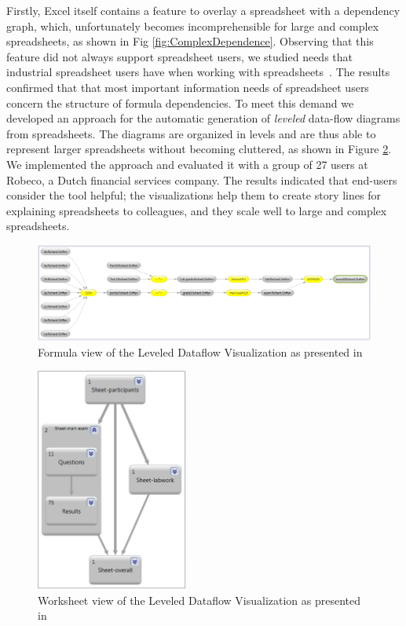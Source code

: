 \documentclass[conference]{IEEEtran}
\begin{document}
Firstly, Excel itself contains a feature to overlay a spreadsheet with a dependency graph, which, unfortunately becomes incomprehensible for large and complex spreadsheets, as shown in Fig \ref{fig:ComplexDependence}. Observing that this feature did not always support spreadsheet users, we studied needs that industrial spreadsheet users have when working with spreadsheets~\cite{hermans_supporting_2011}. The results confirmed that that most important information needs of spreadsheet users concern the structure of formula dependencies. To meet this demand we developed an approach for the automatic generation of \emph{leveled} data-flow diagrams from spreadsheets. The diagrams are organized in levels and are thus able to represent larger spreadsheets without becoming cluttered, as shown in Figure \ref{fig:worksheet-view}. We implemented the approach and evaluated it with a group of 27 users at Robeco, a Dutch financial services company. The results indicated that end-users consider the tool helpful; the visualizations help them to create story lines for explaining spreadsheets to colleagues, and they scale well to large and complex spreadsheets. 

\begin{figure}
  \begin{center}
  \includegraphics[width=\columnwidth]{fig/formula-view.png}
  \caption{Formula view of the Leveled Dataflow Visualization as presented in \cite{hermans_supporting_2011}}
  \label{fig:formula-view}
  \end{center}
\end{figure} 

\begin{figure}
  \begin{center}
  \includegraphics[width=5cm]{fig/worksheet-view.png}
  \caption{Worksheet view of the Leveled Dataflow Visualization as presented in \cite{hermans_supporting_2011}}
  \label{fig:worksheet-view}
  \end{center}
\end{figure} 
\end{document}
